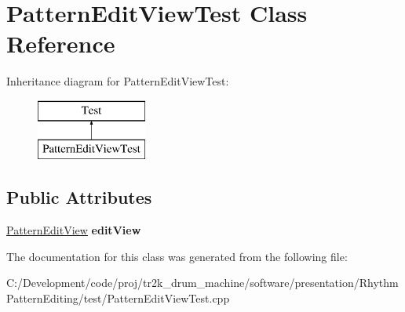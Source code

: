 \hypertarget{class_pattern_edit_view_test}{}\section{Pattern\+Edit\+View\+Test Class Reference}
\label{class_pattern_edit_view_test}
Inheritance diagram for Pattern\+Edit\+View\+Test\+:\begin{figure}[H]
\begin{center}
\leavevmode
\includegraphics[height=2.000000cm]{class_pattern_edit_view_test}
\end{center}
\end{figure}
\subsection*{Public Attributes}
\begin{DoxyCompactItemize}
\item 
\mbox{\label{class_pattern_edit_view_test_a92561096e16a05ef72b092757585cbb2}} 
\mbox{\hyperlink{class_pattern_edit_view}{Pattern\+Edit\+View}} {\bfseries edit\+View}
\end{DoxyCompactItemize}


The documentation for this class was generated from the following file\+:\begin{DoxyCompactItemize}
\item 
C\+:/\+Development/code/proj/tr2k\+\_\+drum\+\_\+machine/software/presentation/\+Rhythm\+Pattern\+Editing/test/Pattern\+Edit\+View\+Test.\+cpp\end{DoxyCompactItemize}
